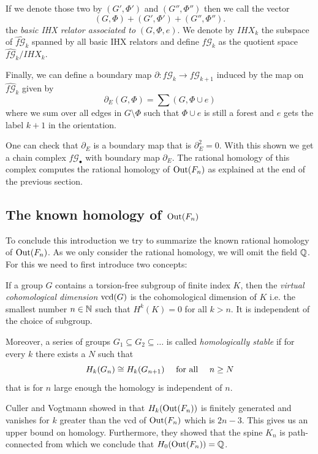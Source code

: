 If we denote those two by $(G',\Phi')$ and  $(G'',\Phi'')$ then we call the vector
\[
	(G,\Phi) + (G',\Phi') + (G'',\Phi'')
.\] 
the \emph{basic IHX relator associated to} $(G,\Phi,e)$. 
We denote by $IHX_{k}$ the subspace of $\widehat{f\mathcal{G}}_{k}$ spanned by all basic IHX relators
and define $f\mathcal{G}_{k}$ as the quotient space $\widehat{f\mathcal{G}}_{k} / IHX_{k}$.

Finally, we can define a boundary map  $\partial: f\mathcal{G}_{k} \to f\mathcal{G}_{k+1}$ induced by the map on $\widehat{f \mathcal{G}}_{k}$ given by
\[
	\partial_{E}(G,\Phi) = \sum (G,\Phi \cup e)
\] 
where we sum over all edges in $G \setminus \Phi$ such that $\Phi \cup e$ is still a forest and 
$e$ gets the label $k+1$ in the orientation.

One can check that $\partial_{E}$ is a boundary map that is $\partial_{E}^2 = 0$.
With this shown we get a chain complex $f\mathcal{G}_{\bullet}$ with boundary map $\partial_{E}$.
The rational homology of this complex computes the rational homology of $\operatorname{Out}(F_{n})$ as
explained at the end of the previous section.

\subsection{The known homology of \texorpdfstring{\boldmath$\operatorname{Out}(F_{n})$}{Out(Fn)}}
To conclude this introduction we try to summarize the known rational homology of $\operatorname{Out}(F_{n})$.
As we only consider the rational homology, we will omit the field $\mathbb{Q}$.
For this we need to first introduce two concepts:
\begin{definition}
	If a group $G$ contains a torsion-free subgroup of finite index $K$, then the \emph{virtual cohomological dimension} $\operatorname{vcd}(G)$
	is the cohomological dimension of $K$ i.e. the smallest number $n \in \mathbb{N}$ such that $H^{k}(K) = 0$ for all $k > n$. It is independent of the choice of subgroup.

Moreover, a series of groups $G_1 \subseteq G_2 \subseteq \ldots$ is called \emph{homologically stable} if for every $k$ 
there exists a $N$ such that 
\[
	H_{k}(G_{n}) \cong H_{k}(G_{n+1}) \qq{ for all } n \geq N
\]
that is for $n$ large enough the homology is independent of  $n$.
\end{definition}

Culler and Vogtmann showed in \cite{vogtmann86} that $H_{k}(\operatorname{Out}(F_{n}))$ is finitely generated and vanishes for $k$ greater
than the vcd of $\operatorname{Out}(F_{n})$ which is $2n -3$. This gives us an upper bound on homology.
Furthermore, they showed that the spine $K_{n}$ is path-connected from which we conclude that $H_0(\operatorname{Out}(F_{n})) = \mathbb{Q}$.


